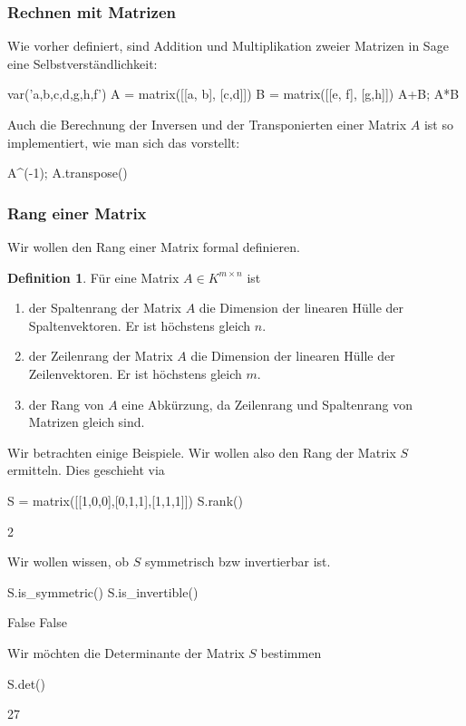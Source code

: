 \documentclass[fontsize=12pt,paper=a4,twoside,bibtotoc,idxtotoc,
liststotoc,pagesize,BCOR1.2cm,DIV15,chapterprefix,pagesize=pdftex]{scrbook}
\theoremstyle{plain}
\theoremstyle{definition}
\newtheorem{df}[equation]{Definition}
\theoremstyle{remark}
\begin{document}
\subsubsection{Rechnen mit Matrizen} 
Wie vorher definiert, sind Addition und Multiplikation zweier Matrizen in Sage eine Selbstverständlichkeit:
\begin{sagein}
var('a,b,c,d,g,h,f')
A = matrix([[a, b], [c,d]])
B = matrix([[e, f], [g,h]])
A+B; A*B
\end{sagein}
Auch die Berechnung der Inversen und der Transponierten einer Matrix $A$ ist so implementiert, wie man sich das vorstellt:
\begin{sagein}
A^(-1); A.transpose()
\end{sagein}
\subsubsection{Rang einer Matrix}
Wir wollen den Rang einer Matrix formal definieren.
\begin{df}
Für eine Matrix $A \in K^{m \times n}$ ist 
\begin{enumerate}
 \item der Spaltenrang der Matrix $A$ die Dimension der linearen Hülle der Spaltenvektoren. Er ist höchstens gleich $n$.
 \item der Zeilenrang der Matrix $A$ die Dimension der linearen Hülle der Zeilenvektoren. Er ist höchstens gleich $m$.
 \item der Rang von $A$ eine Abkürzung, da Zeilenrang und Spaltenrang von Matrizen gleich sind. 
\end{enumerate}
\end{df}
Wir betrachten einige Beispiele. Wir wollen also den Rang der Matrix $S$ ermitteln. Dies geschieht via
\begin{sagein}
S = matrix([[1,0,0],[0,1,1],[1,1,1]])
S.rank()
\end{sagein}
\begin{sageout}
  2
\end{sageout}
Wir wollen wissen, ob $S$ symmetrisch bzw invertierbar ist.
\begin{sagein}
S.is_symmetric() 
S.is_invertible()
\end{sagein}
\begin{sageout}
False
False
\end{sageout}
Wir möchten die Determinante der Matrix $S$ bestimmen
\begin{sagein}
S.det()
\end{sagein}
\begin{sageout}
  27
\end{sageout}
\end{document}
